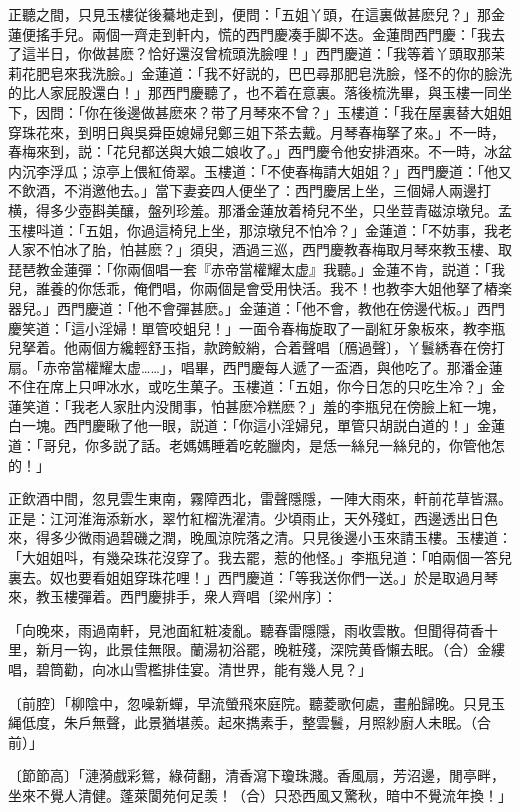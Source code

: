 正聽之間，只見玉樓従後驀地走到，便問：「五姐丫頭，在這裏做甚麽兒？」那金蓮便搖手兒。兩個一齊走到軒内，慌的西門慶凑手脚不迭。金蓮問西門慶：「我去了這半日，你做甚麽？恰好還沒曾梳頭洗臉哩！」西門慶道：「我等着丫頭取那茉莉花肥皂來我洗臉。」金蓮道：「我不好説的，巴巴尋那肥皂洗臉，怪不的你的臉洗的比人家屁股還白！」那西門慶聽了，也不着在意裏。落後梳洗畢，與玉樓一同坐下，因問：「你在後邊做甚麽來？带了月琴來不曾？」玉樓道：「我在屋裏替大姐姐穿珠花來，到明日與吳舜臣媳婦兒鄭三姐下茶去戴。月琴春梅拏了來。」不一時，春梅來到，説：「花兒都送與大娘二娘收了。」西門慶令他安排酒來。不一時，冰盆内沉李浮瓜；涼亭上偎紅倚翠。玉樓道：「不使春梅請大姐姐？」西門慶道：「他又不飲酒，不消邀他去。」當下妻妾四人便坐了：西門慶居上坐，三個婦人兩邊打横，得多少壺斟美釀，盤列珍羞。那潘金蓮放着椅兒不坐，只坐荳青磁涼墩兒。孟玉樓呌道：「五姐，你過這椅兒上坐，那涼墩兒不怕冷？」金蓮道：「不妨事，我老人家不怕冰了胎，怕甚麽？」須臾，酒過三巡，西門慶教春梅取月琴來教玉樓、取琵琶教金蓮彈：「你兩個唱一套『赤帝當權耀太虚』我聽。」金蓮不肯，説道：「我兒，誰養的你恁乖，俺們唱，你兩個是會受用快活。我不！也教李大姐他拏了樁楽器兒。」西門慶道：「他不會彈甚麽。」金蓮道：「他不會，教他在傍邊代板。」西門慶笑道：「這小淫婦！單管咬蛆兒！」一面令春梅旋取了一副紅牙象板來，教李瓶兒拏着。他兩個方纔輕舒玉指，款跨鮫綃，合着聲唱〔鴈過聲〕，丫鬟綉春在傍打扇。「赤帝當權耀太虚……」，唱畢，西門慶每人遞了一盃酒，與他吃了。那潘金蓮不住在席上只呷冰水，或吃生菓子。玉樓道：「五姐，你今日怎的只吃生冷？」金蓮笑道：「我老人家肚内没閒事，怕甚麽冷糕麽？」羞的李瓶兒在傍臉上紅一塊，白一塊。西門慶瞅了他一眼，説道：「你這小淫婦兒，單管只胡説白道的！」金蓮道：「哥兒，你多説了話。老媽媽睡着吃乾臘肉，是恁一絲兒一絲兒的，你管他怎的！」

正飲酒中間，忽見雲生東南，霧障西北，雷聲隱隱，一陣大雨來，軒前花草皆濕。正是：江河淮海添新水，翠竹紅榴洗濯清。少頃雨止，天外殘虹，西邊透出日色來，得多少微雨過碧磯之潤，晚風涼院落之清。只見後邊小玉來請玉樓。玉樓道：「大姐姐呌，有幾朶珠花沒穿了。我去罷，惹的他怪。」李瓶兒道：「咱兩個一答兒裏去。奴也要看姐姐穿珠花哩！」西門慶道：「等我送你們一送。」於是取過月琴來，教玉樓彈着。西門慶排手，衆人齊唱〔梁州序〕：

\begin{myquote}
「向晚來，雨過南軒，見池面紅粧凌亂。聽春雷隱隱，雨收雲散。但聞得荷香十里，新月一钩，此景佳無限。蘭湯初浴罷，晚粧殘，深院黄昏懶去眠。{\marktext（合）}金縷唱，碧筒勸，向冰山雪檻排佳宴。清世界，能有幾人見？」

{\markfont〔前腔〕}「柳陰中，忽噪新蟬，早流螢飛來庭院。聽菱歌何處，畫船歸晚。只見玉䋲低度，朱戶無聲，此景猶堪羨。起來擕素手，整雲鬟，月照紗廚人未眠。{\marktext（合前）}」

{\markfont〔節節高〕}「漣漪戲彩鴛，綠荷翻，清香瀉下瓊珠濺。香風扇，芳沼邊，閒亭畔，坐來不覺人清健。蓬萊閬苑何足羡！{\marktext（合）}只恐西風又驚秋，暗中不覺流年換！」
\end{myquote}

